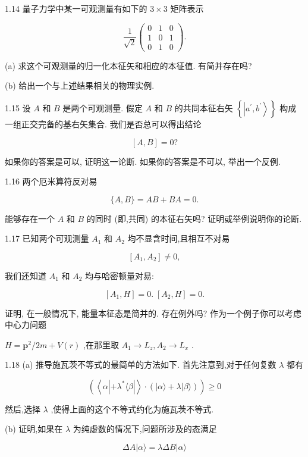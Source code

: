 \documentclass[lang=cn,newtx,10pt,scheme=chinese,thmcnt=section]{elegantbook}
\begin{document}
1.14 量子力学中某一可观测量有如下的 $3 \times 3$ 矩阵表示

$$
\frac{1}{\sqrt{2}}\left( \begin{array}{lll} 0 & 1 & 0 \\ 1 & 0 & 1 \\ 0 & 1 & 0 \end{array}\right) .
$$

(a) 求这个可观测量的归一化本征矢和相应的本征值. 有简并存在吗?

(b) 给出一个与上述结果相关的物理实例.

1.15 设 $A$ 和 $B$ 是两个可观测量. 假定 $A$ 和 $B$ 的共同本征右矢 $\left\{ \left| {{a}^{\prime },{b}^{\prime }}\right\rangle \right\}$ 构成一组正交完备的基右矢集合. 我们是否总可以得出结论

$$
\left\lbrack {A, B}\right\rbrack = 0?
$$

如果你的答案是可以, 证明这一论断. 如果你的答案是不可以, 举出一个反例.

1.16 两个厄米算符反对易

$$
\{ A, B\} = {AB} + {BA} = 0.
$$

能够存在一个 $A$ 和 $B$ 的同时 (即,共同) 的本征右矢吗? 证明或举例说明你的论断.

1.17 已知两个可观测量 ${A}_{1}$ 和 ${A}_{2}$ 均不显含时间,且相互不对易

$$
\left\lbrack {{A}_{1},{A}_{2}}\right\rbrack \neq 0,
$$

我们还知道 ${A}_{1}$ 和 ${A}_{2}$ 均与哈密顿量对易:

$$
\left\lbrack {{A}_{1}, H}\right\rbrack = 0.\;\left\lbrack {{A}_{2}, H}\right\rbrack = 0.
$$

证明, 在一般情况下, 能量本征态是简并的. 存在例外吗? 作为一个例子你可以考虑中心力问题

$H = {\mathbf{p}}^{2}/{2m} + V\left( r\right)$ ,在那里取 ${A}_{1} \rightarrow {L}_{z},{A}_{2} \rightarrow {L}_{x}$ .

1.18 (a) 推导施瓦茨不等式的最简单的方法如下. 首先注意到,对于任何复数 $\lambda$ 都有

$$
\left( {\left\langle {\alpha \left| {+{\lambda }^{ * }\langle \beta }\right| }\right\rangle \cdot \left( {\left| {\alpha \rangle + \lambda }\right| \beta \rangle }\right) }\right) \geq 0
$$

然后,选择 $\lambda$ ,使得上面的这个不等式约化为施瓦茨不等式.

(b) 证明,如果在 $\lambda$ 为纯虚数的情况下,问题所涉及的态满足

$$
{\Delta A}\left| {\alpha \rangle = {\lambda \Delta B}}\right| \alpha \rangle
$$
\end{document}
